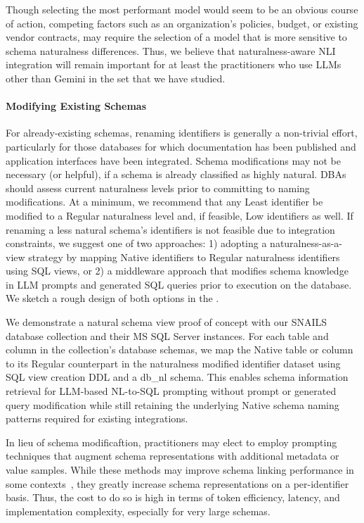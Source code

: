 Though selecting the most performant model would seem to be an obvious course of action, competing factors such as an organization's policies, budget, or existing vendor contracts, may require the selection of a model that is more sensitive to schema naturalness differences. 
Thus, we believe that naturalness-aware NLI integration will remain important for at least the practitioners who use LLMs other than Gemini in the set that we have studied.


\paragraph{\textbf{Modifying Existing Schemas}}
For already-existing schemas, renaming identifiers is generally a non-trivial effort, particularly for those databases for which documentation has been published and application interfaces have been integrated.
Schema modifications may not be necessary (or helpful), if a schema is already classified as highly natural.
DBAs should assess current naturalness levels prior to committing to naming modifications.
At a minimum, we recommend that any Least identifier be modified to a Regular naturalness level and, if feasible, Low identifiers as well.
If renaming a less natural schema's identifiers is not feasible due to integration constraints, we suggest one of two approaches: 1) adopting a naturalness-as-a-view strategy by mapping Native identifiers to Regular naturalness identifiers using SQL views, or 2) a middleware approach that modifies schema knowledge in LLM prompts and generated SQL queries prior to execution on the database.
We sketch a rough design of both options in the \fi.

We demonstrate a natural schema view proof of concept with our SNAILS database collection and their MS SQL Server instances.
For each table and column in the collection's database schemas, we map the Native table or column to its Regular counterpart in the naturalness modified identifier dataset using SQL view creation DDL and a db\_nl schema.
This enables schema information retrieval for LLM-based NL-to-SQL prompting without prompt or generated query modification while still retaining the underlying Native schema naming patterns required for existing integrations.

In lieu of schema modificaftion, practitioners may elect to employ prompting techniques that augment schema representations with additional metadata or value samples.
While these methods may improve schema linking performance in some contexts~\cite{nan2023enhancingfewshottexttosqlcapabilities}, they greatly increase schema representations on a per-identifier basis.
Thus, the cost to do so is high in terms of token efficiency, latency, and implementation complexity, especially for very large schemas.

